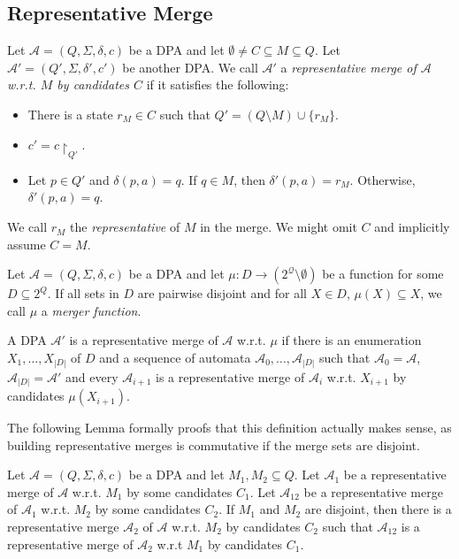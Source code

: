 \subsection{Representative Merge}

\begin{defn}
	Let $\mathcal{A} = (Q, \Sigma, \delta, c)$ be a DPA and let $\emptyset \neq C \subseteq M \subseteq Q$. Let $\mathcal{A}' = (Q', \Sigma, \delta', c')$ be another DPA. We call $\mathcal{A}'$ a \emph{representative merge of $\mathcal{A}$ w.r.t. $M$ by candidates $C$} if it satisfies the following:
	\begin{itemize}
		\item There is a state $r_M \in C$ such that $Q' = (Q \setminus M) \cup \{r_M\}$.
		\item $c' = c\upharpoonright_{Q'}$.
		\item Let $p \in Q'$ and $\delta(p, a) = q$. If $q \in M $, then $\delta'(p, a) = r_M$. Otherwise, $\delta'(p, a) = q$. 
	\end{itemize}
	
	We call $r_M$ the \emph{representative} of $M$ in the merge. We might omit $C$ and implicitly assume $C = M$.
\end{defn}

\begin{defn}
	Let $\mathcal{A} = (Q, \Sigma, \delta, c)$ be a DPA and let $\mu : D \rightarrow (2^\mathcal{Q} \setminus \emptyset)$ be a function for some $D \subseteq 2^Q$. If all sets in $D$ are pairwise disjoint and for all $X \in D$, $\mu(X) \subseteq X$, we call $\mu$ a \emph{merger function}. 
	
	A DPA $\mathcal{A}'$ is a representative merge of $\mathcal{A}$ w.r.t. $\mu$ if there is an enumeration $X_1, \dots, X_{|D|}$ of $D$ and a sequence of automata $\mathcal{A}_0, \dots, \mathcal{A}_{|D|}$ such that $\mathcal{A}_0 = \mathcal{A}$, $\mathcal{A}_{|D|} = \mathcal{A}'$ and every $\mathcal{A}_{i+1}$ is a representative merge of $\mathcal{A}_i$ w.r.t. $X_{i+1}$ by candidates $\mu(X_{i+1})$.
\end{defn}

\vspace{5pt}

The following Lemma formally proofs that this definition actually makes sense, as building representative merges is commutative if the merge sets are disjoint.

\begin{lem}
	Let $\mathcal{A} = (Q, \Sigma, \delta, c)$ be a DPA and let $M_1, M_2 \subseteq Q$. Let $\mathcal{A}_1$ be a representative merge of $\mathcal{A}$ w.r.t. $M_1$ by some candidates $C_1$. Let $\mathcal{A}_{12}$ be a representative merge of $\mathcal{A}_1$ w.r.t. $M_2$ by some candidates $C_2$. If $M_1$ and $M_2$ are disjoint, then there is a representative merge $\mathcal{A}_2$ of $\mathcal{A}$ w.r.t. $M_2$ by candidates $C_2$ such that $\mathcal{A}_{12}$ is a representative merge of $\mathcal{A}_2$ w.r.t $M_1$ by candidates $C_1$.
\end{lem}


